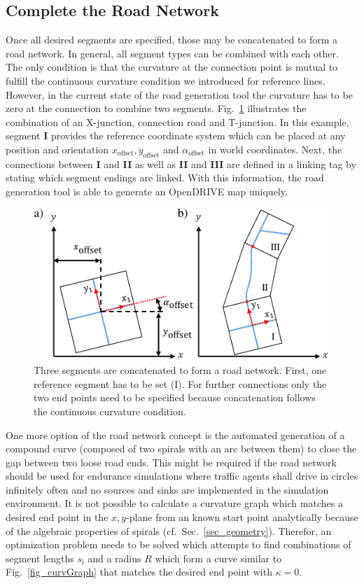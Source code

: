\documentclass[a4paper, 10pt, conference]{ieeeconf}      %
\begin{document}
\subsection{Complete the Road Network}
Once all desired segments are specified, those may be concatenated to form a road network. In general, all segment types can be combined with each other. The only condition is that the curvature at the connection point is mutual to fulfill the continuous curvature condition we introduced for reference lines. However, in the current state of the road generation tool the curvature has to be zero at the connection to combine two segments. Fig.~\ref{fig_concatSeg} illustrates the combination of an X-junction, connection road and T-junction. In this example, segment \textbf{I} provides the reference coordinate system which can be placed at any position and orientation $x_\text{offset}, y_\text{offset}$ and $\alpha_\text{offset}$ in world coordinates. Next, the connections between \textbf{I} and \textbf{II} as well as \textbf{II} and \textbf{III} are defined in a linking tag by stating which segment endings are linked. With this information, the road generation tool is able to generate an OpenDRIVE map uniquely.
\begin{figure}[thpb] 		
	\centering
	\includegraphics{fig/concatSegments.pdf}
	\caption{Three segments are concatenated to form a road network. First, one reference segment has to be set (I). For further connections only the two end points need to be specified because concatenation follows the continuous curvature condition.}
	\label{fig_concatSeg}
\end{figure}

One more option of the road network concept is the automated generation of a compound curve (composed of two spirals with an arc between them) to close the gap between two loose road ends. This might be required if the road network should be used for endurance simulations where traffic agents shall drive in circles infinitely often and no sources and sinks are implemented in the simulation environment. It is not possible to calculate a curvature graph which matches a desired end point in the $x,y$-plane from an known start point analytically because of the algebraic properties of spirals (cf.~Sec.~\ref{sec_geometry}). Therefor, an optimization problem needs to be solved which attempts to find combinations of segment lengths $s_\text{i}$ and a radius $R$ which form a curve similar to Fig.~\ref{fig_curvGraph} that matches the desired end point with $\kappa=0$.
\end{document}
